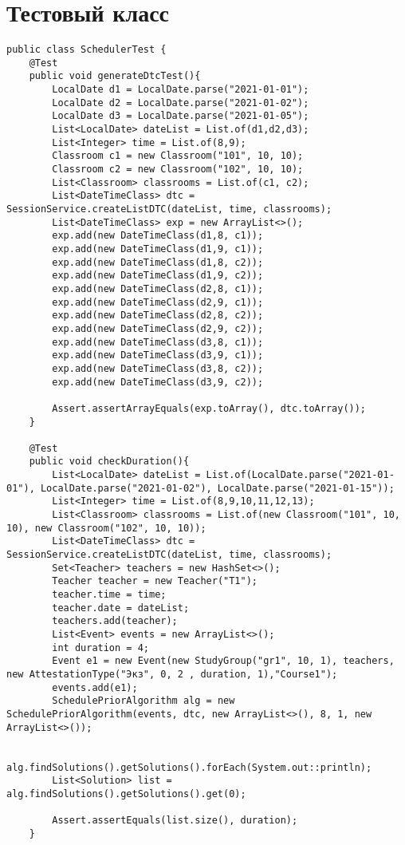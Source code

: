 \chapter{Тестовый класс}\label{appendix-test}	
\begin{lstlisting}
public class SchedulerTest {
	@Test
	public void generateDtcTest(){
		LocalDate d1 = LocalDate.parse("2021-01-01");
		LocalDate d2 = LocalDate.parse("2021-01-02");
		LocalDate d3 = LocalDate.parse("2021-01-05");
		List<LocalDate> dateList = List.of(d1,d2,d3);
		List<Integer> time = List.of(8,9);
		Classroom c1 = new Classroom("101", 10, 10);
		Classroom c2 = new Classroom("102", 10, 10);
		List<Classroom> classrooms = List.of(c1, c2);
		List<DateTimeClass> dtc = SessionService.createListDTC(dateList, time, classrooms);
		List<DateTimeClass> exp = new ArrayList<>();
		exp.add(new DateTimeClass(d1,8, c1));
		exp.add(new DateTimeClass(d1,9, c1));
		exp.add(new DateTimeClass(d1,8, c2));
		exp.add(new DateTimeClass(d1,9, c2));
		exp.add(new DateTimeClass(d2,8, c1));
		exp.add(new DateTimeClass(d2,9, c1));
		exp.add(new DateTimeClass(d2,8, c2));
		exp.add(new DateTimeClass(d2,9, c2));
		exp.add(new DateTimeClass(d3,8, c1));
		exp.add(new DateTimeClass(d3,9, c1));
		exp.add(new DateTimeClass(d3,8, c2));
		exp.add(new DateTimeClass(d3,9, c2));
		
		Assert.assertArrayEquals(exp.toArray(), dtc.toArray());
	}
	
	@Test
	public void checkDuration(){
		List<LocalDate> dateList = List.of(LocalDate.parse("2021-01-01"), LocalDate.parse("2021-01-02"), LocalDate.parse("2021-01-15"));
		List<Integer> time = List.of(8,9,10,11,12,13);
		List<Classroom> classrooms = List.of(new Classroom("101", 10, 10), new Classroom("102", 10, 10));
		List<DateTimeClass> dtc = SessionService.createListDTC(dateList, time, classrooms);
		Set<Teacher> teachers = new HashSet<>();
		Teacher teacher = new Teacher("T1");
		teacher.time = time;
		teacher.date = dateList;
		teachers.add(teacher);
		List<Event> events = new ArrayList<>();
		int duration = 4;
		Event e1 = new Event(new StudyGroup("gr1", 10, 1), teachers, new AttestationType("Экз", 0, 2 , duration, 1),"Course1");
		events.add(e1);
		SchedulePriorAlgorithm alg = new SchedulePriorAlgorithm(events, dtc, new ArrayList<>(), 8, 1, new ArrayList<>());
		
		alg.findSolutions().getSolutions().forEach(System.out::println);
		List<Solution> list = alg.findSolutions().getSolutions().get(0);
		
		Assert.assertEquals(list.size(), duration);
	}
	

\end{lstlisting}

